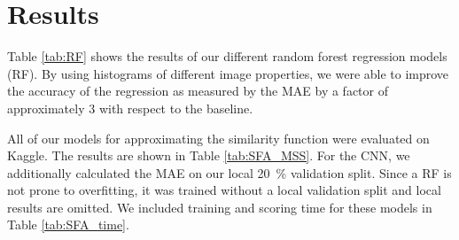 \documentclass[10pt,conference,compsocconf]{IEEEtran}
\begin{document}

\section{Results}
\label{sec:results}

Table \ref{tab:RF} shows the results of our different random forest regression models (RF). By using histograms of different image properties, we were able to improve the accuracy of the regression as measured by the MAE by a factor of approximately 3 with respect to the baseline.

All of our models for approximating the similarity function were evaluated on Kaggle. The results are shown in Table \ref{tab:SFA_MSS}.
For the CNN, we additionally calculated the MAE on our local \SI{20}{\percent} validation split. Since a RF is not prone to overfitting, it was trained without a local validation split and local results are omitted. We included training and scoring time for these models in Table \ref{tab:SFA_time}. 
\end{document}
